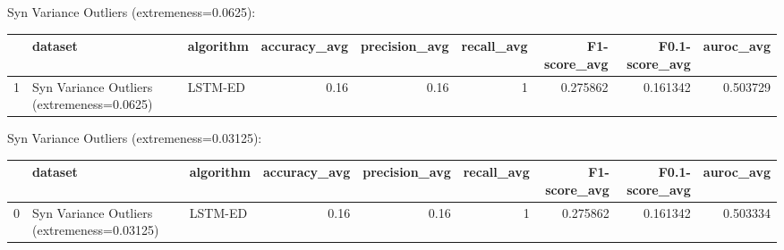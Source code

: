 Syn Variance Outliers (extremeness=0.0625):

\begin{tabular}{rllrrrrrr}
\hline
    & dataset                                    & algorithm   &   accuracy\_avg &   precision\_avg &   recall\_avg &   F1-score\_avg &   F0.1-score\_avg &   auroc\_avg \\
\hline
  1 & Syn Variance Outliers (extremeness=0.0625) & LSTM-ED     &           0.16 &            0.16 &            1 &       0.275862 &         0.161342 &    0.503729 \\
\hline
\end{tabular}

Syn Variance Outliers (extremeness=0.03125):

\begin{tabular}{rllrrrrrr}
\hline
    & dataset                                     & algorithm   &   accuracy\_avg &   precision\_avg &   recall\_avg &   F1-score\_avg &   F0.1-score\_avg &   auroc\_avg \\
\hline
  0 & Syn Variance Outliers (extremeness=0.03125) & LSTM-ED     &           0.16 &            0.16 &            1 &       0.275862 &         0.161342 &    0.503334 \\
\hline
\end{tabular}

